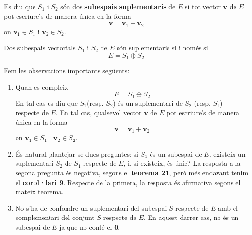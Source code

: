 \begin{definicio}
Es diu que $S_{1}$ i $S_{2}$ són dos \textbf{subespais
suplementaris} de $E$ si tot vector $\mathbf{v}$ de $E$
pot escriure’s de manera única en la forma%
\begin{equation*}
\mathbf{v}=\mathbf{v}_{1}+\mathbf{v}_{2}
\end{equation*}%
on $\mathbf{v}_{1}\in S_{1}$ i $\mathbf{v}_{2}\in S%
_{2}$.
\end{definicio}

\begin{corollari}
Dos subespais vectorials $S_{1}$ i $S_{2}$ de $E$ són suplementaris si i només si%
\begin{equation*}
E=S_{1}\oplus S_{2}
\end{equation*}
\end{corollari}

\begin{observacio}
Fem les observacions importants següents:

\begin{enumerate}
\item Quan es compleix%
\begin{equation*}
E=S_{1}\oplus S_{2}
\end{equation*}%
En tal cas es diu que $S_{1}$(resp. $S_{2}$) és un
suplementari de $S_{2}$ (resp. $S_{1}$) respecte de $%
E$. En tal cas, qualsevol vector $\mathbf{v}$ de $E$
pot escriure’s de manera única en la forma%
\begin{equation*}
\mathbf{v}=\mathbf{v}_{1}+\mathbf{v}_{2}
\end{equation*}%
on $\mathbf{v}_{1}\in S_{1}$ i $\mathbf{v}_{2}\in S%
_{2}$.

\item És natural plantejar-se dues preguntes: si $S_{1}$ és un
subespai de $E$, existeix un suplementari $%
S_{2}$ de $S_{1}$ respecte de $E$, i, si existeix,
és únic? La resposta a la segona pregunta és negativa, segons el 
\textbf{teorema 21}, però més endavant tenim el \textbf{corol·lari 9}.
Respecte de la primera, la resposta és afirmativa segons el mateix teorema.

\item No s’ha de confondre un suplementari del subespai $S$
respecte de $E$ amb el complementari del conjunt $S$ respecte de $%
E$. En aquest darrer cas, no és un subespai de $E$ ja
que no conté el $\mathbf{0}$.
\end{enumerate}
\end{observacio}

